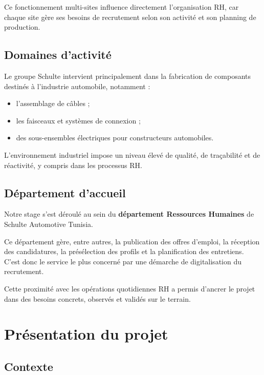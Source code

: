 Ce fonctionnement multi-sites influence directement l'organisation RH,
car chaque site gère ses besoins de recrutement selon son activité et
son planning de production.

\subsection{Domaines d'activité}

Le groupe Schulte intervient principalement dans la fabrication de
composants destinés à l'industrie automobile, notamment :
\begin{itemize}
    \item l'assemblage de câbles ;
    \item les faisceaux et systèmes de connexion ;
    \item des sous-ensembles électriques pour constructeurs automobiles.
\end{itemize}

L'environnement industriel impose un niveau élevé de qualité, de
traçabilité et de réactivité, y compris dans les processus RH.

\subsection{Département d'accueil}

Notre stage s'est déroulé au sein du \textbf{département Ressources
Humaines} de Schulte Automotive Tunisia.

Ce département gère, entre autres, la publication des offres d'emploi,
la réception des candidatures, la présélection des profils et la
planification des entretiens. C'est donc le service le plus concerné
par une démarche de digitalisation du recrutement.

Cette proximité avec les opérations quotidiennes RH a permis d'ancrer le
projet dans des besoins concrets, observés et validés sur le terrain.

\section{Présentation du projet}

\subsection{Contexte}

